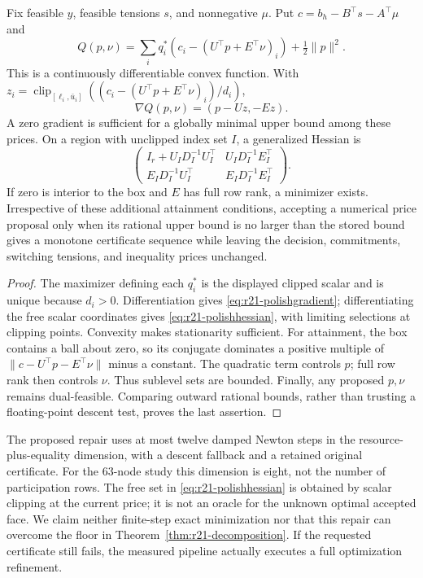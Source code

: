 \begin{proposition}\label{prop:r21-polishing}
Fix feasible $y$, feasible tensions $s$, and nonnegative $\mu$. Put $c=b_h-B^\top s-A^\top\mu$ and
\[
 Q(p,\nu)=\sum_iq_i^*(c_i-(U^\top p+E^\top\nu)_i)+\tfrac12\|p\|^2.
\]
This is a continuously differentiable convex function. With
$z_i=\operatorname{clip}_{[\ell_i,\bar u_i]}((c_i-(U^\top p+E^\top\nu)_i)/d_i)$,
\begin{equation}\label{eq:r21-polishgradient}
 \nabla Q(p,\nu)=(p-Uz,-Ez).
\end{equation}
A zero gradient is sufficient for a globally minimal upper bound among these prices. On a region with unclipped index set $I$, a generalized Hessian is
\begin{equation}\label{eq:r21-polishhessian}
 \begin{pmatrix}
 I_r+U_ID_I^{-1}U_I^\top&U_ID_I^{-1}E_I^\top\\
 E_ID_I^{-1}U_I^\top&E_ID_I^{-1}E_I^\top
 \end{pmatrix}.
\end{equation}
If zero is interior to the box and $E$ has full row rank, a minimizer exists. Irrespective of these additional attainment conditions, accepting a numerical price proposal only when its rational upper bound is no larger than the stored bound gives a monotone certificate sequence while leaving the decision, commitments, switching tensions, and inequality prices unchanged.
\end{proposition}
\begin{proof}
The maximizer defining each $q_i^*$ is the displayed clipped scalar and is unique because $d_i>0$. Differentiation gives \eqref{eq:r21-polishgradient}; differentiating the free scalar coordinates gives \eqref{eq:r21-polishhessian}, with limiting selections at clipping points. Convexity makes stationarity sufficient. For attainment, the box contains a ball about zero, so its conjugate dominates a positive multiple of $\|c-U^\top p-E^\top\nu\|$ minus a constant. The quadratic term controls $p$; full row rank then controls $\nu$. Thus sublevel sets are bounded. Finally, any proposed $p,\nu$ remains dual-feasible. Comparing outward rational bounds, rather than trusting a floating-point descent test, proves the last assertion.
\end{proof}
The proposed repair uses at most twelve damped Newton steps in the resource-plus-equality dimension, with a descent fallback and a retained original certificate. For the 63-node study this dimension is eight, not the number of participation rows. The free set in \eqref{eq:r21-polishhessian} is obtained by scalar clipping at the current price; it is not an oracle for the unknown optimal accepted face. We claim neither finite-step exact minimization nor that this repair can overcome the floor in Theorem~\ref{thm:r21-decomposition}. If the requested certificate still fails, the measured pipeline actually executes a full optimization refinement.

